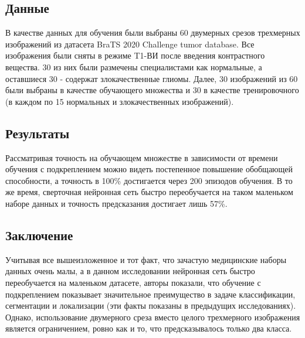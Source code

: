 \subsection*{Данные}
В качестве данных для обучения были выбраны 60 двумерных срезов трехмерных изображений из датасета BraTS 2020 Challenge tumor database. 
Все изображения были сняты в режиме T1-ВИ после введения контрастного вещества. 30 из них были размечены специалистами как нормальные,
а оставшиеся 30 - содержат злокачественные глиомы. Далее, 30 изображений из 60 были выбраны в качестве обучающего множества и 
30 в качестве тренировочного (в каждом по 15 нормальных и злокачественных изображений).
\subsection*{Результаты}
Рассматривая точность на обучающем множестве в зависимости от времени обучения с подкреплением можно видеть постепенное 
повышение обобщающей способности, а точность в 100\%  достигается через 200 эпизодов обучения. В то же время, 
сверточная нейронная сеть быстро переобучается на таком маленьком наборе данных и точность предсказания достигает лишь 57\%.
\subsection*{Заключение}
Учитывая все вышеизложенное и тот факт, что зачастую медицинские наборы данных очень малы, а в данном исследовании 
\grqq\quad нейронная сеть быстро переобучается на маленьком датасете, авторы показали, 
что обучение с подкреплением показывает значительное преимущество в задаче классификации, сегментации 
и локализации (эти факты показаны в предыдущих исследованиях). Однако, использование двумерного среза 
вместо целого трехмерного изображения является ограничением, ровно как и то, что предсказывалось только два класса.

